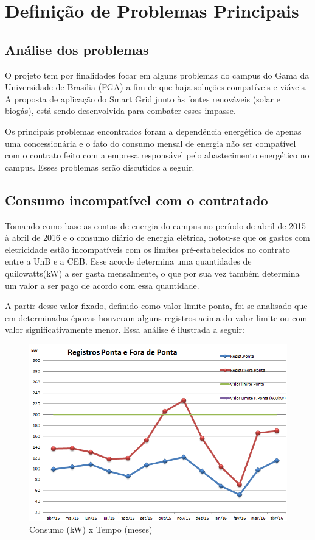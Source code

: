 \newpage

\section{Definição de Problemas Principais}

\subsection{Análise dos problemas}
O projeto tem por finalidades focar em alguns problemas do campus do Gama da Universidade de Brasília (FGA) a fim de que haja soluções compatíveis e viáveis. A proposta de aplicação do Smart Grid junto às fontes renováveis (solar e biogás), está sendo desenvolvida para combater esses impasse.
\par Os principais problemas encontrados foram  a dependência energética de apenas uma concessionária e o fato do consumo mensal de energia não ser compatível com o contrato feito com a empresa responsável pelo abastecimento energético no campus. Esses problemas serão discutidos a seguir.

\subsection {Consumo incompatível com o contratado} 
Tomando como base as contas de energia do campus no período de abril de 2015 à abril de 2016 e o consumo diário de energia elétrica, notou-se que os gastos com  eletricidade estão incompatíveis com os limites pré-estabelecidos no contrato entre a UnB e a CEB. Esse acorde determina uma quantidades de quilowatts(kW) a ser gasta mensalmente, o que por sua vez também determina um valor a ser pago de acordo com essa quantidade.
\par A partir desse valor fixado, definido como valor limite ponta, foi-se analisado que em determinadas épocas houveram alguns registros acima do valor limite ou com valor significativamente menor. Essa análise é ilustrada a seguir:
\begin{figure}[!htb]
\centering
\includegraphics[width=0.6\paperwidth]{figuras/graficopontas.png}
\caption{Consumo (kW) x Tempo (meses)}
\end{figure}

